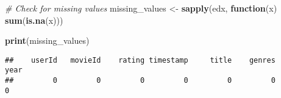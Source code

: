 \documentclass[
]{article}
\newenvironment{Shaded}{\begin{snugshade}}{\end{snugshade}}
\newcommand{\CommentTok}[1]{\textcolor[rgb]{0.56,0.35,0.01}{\textit{#1}}}
\newcommand{\ControlFlowTok}[1]{\textcolor[rgb]{0.13,0.29,0.53}{\textbf{#1}}}
\newcommand{\FunctionTok}[1]{\textcolor[rgb]{0.13,0.29,0.53}{\textbf{#1}}}
\newcommand{\NormalTok}[1]{#1}
\newcommand{\OtherTok}[1]{\textcolor[rgb]{0.56,0.35,0.01}{#1}}
\begin{document}
\begin{Shaded}
\begin{Highlighting}[]
\CommentTok{\# Check for missing values}
\NormalTok{missing\_values }\OtherTok{\textless{}{-}} \FunctionTok{sapply}\NormalTok{(edx, }\ControlFlowTok{function}\NormalTok{(x) }\FunctionTok{sum}\NormalTok{(}\FunctionTok{is.na}\NormalTok{(x)))}

\FunctionTok{print}\NormalTok{(missing\_values)}
\end{Highlighting}
\end{Shaded}

\begin{verbatim}
##    userId   movieId    rating timestamp     title    genres      year 
##         0         0         0         0         0         0         0
\end{verbatim}
\end{document}
